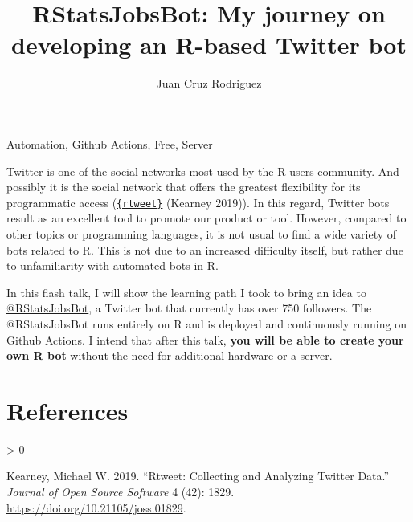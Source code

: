 \documentclass[]{elsarticle} %
\newlength{\cslhangindent}
\newenvironment{CSLReferences}[2] %
 {%
  \setlength{\parindent}{0pt}
  \ifodd #1 \everypar{\setlength{\hangindent}{\cslhangindent}}\ignorespaces\fi
  \ifnum #2 > 0
  \setlength{\parskip}{#2\baselineskip}
  \fi
 }%
 {}
\begin{document}
\begin{frontmatter}

  \title{RStatsJobsBot: My journey on developing an R-based Twitter bot}
    \author[FAMAF - UNC]{Juan Cruz Rodriguez}
      \address[FAMAF - UNC]{FAMAF, Universidad Nacional de Córdoba,
Argentina}
    
  \begin{abstract}
  
  \end{abstract}
   \begin{keyword} Automation, Github Actions, Free, Server\end{keyword}
 \end{frontmatter}

Twitter is one of the social networks most used by the R users
community. And possibly it is the social network that offers the
greatest flexibility for its programmatic access
(\href{https://github.com/ropensci/rtweet}{\texttt{\{rtweet\}}} (Kearney
2019)). In this regard, Twitter bots result as an excellent tool to
promote our product or tool. However, compared to other topics or
programming languages, it is not usual to find a wide variety of bots
related to R. This is not due to an increased difficulty itself, but
rather due to unfamiliarity with automated bots in R.

In this flash talk, I will show the learning path I took to bring an
idea to \href{https://twitter.com/RStatsJobsBot}{@RStatsJobsBot}, a
Twitter bot that currently has over 750 followers. The @RStatsJobsBot
runs entirely on R and is deployed and continuously running on Github
Actions. I intend that after this talk, \textbf{you will be able to
create your own R bot} without the need for additional hardware or a
server.

\hypertarget{references}{%
\section*{References}\label{references}}

\hypertarget{refs}{}
\begin{CSLReferences}{1}{0}
\leavevmode\hypertarget{ref-rtweet-package}{}%
Kearney, Michael W. 2019. {``Rtweet: Collecting and Analyzing Twitter
Data.''} \emph{Journal of Open Source Software} 4 (42): 1829.
\url{https://doi.org/10.21105/joss.01829}.

\end{CSLReferences}
\end{document}
